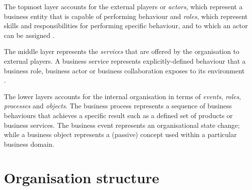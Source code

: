 	The topmost layer accounts for the external players or \textit{actors}, which represent a business entity that is capable of performing behaviour and \textit{roles}, which represent skills and responsibilities for performing specific behaviour, and to which an actor can be assigned \citep{archimate3.1}. 
	
	The middle layer represents the \textit{services} that are offered by the organisation to external players. A business service represents explicitly-defined behaviour that a business role, business actor or business collaboration exposes to its environment \citep{archimate3.1}.
	
	The lower layers accounts for the internal organisation in terms of \textit{events}, \textit{roles}, \textit{processes} and \textit{objects}. The business process represents a sequence of business behaviours that achieves a specific result such as a defined set of products or business services. The business event represents an organisational state change; while a business object represents a (passive) concept used within a particular business domain.
	
	\section{Organisation structure}
	
	